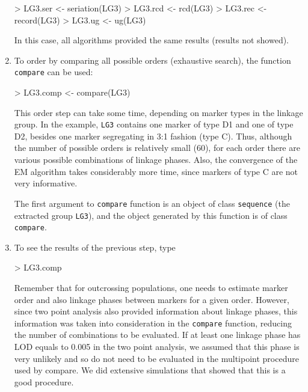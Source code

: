 \documentclass[letterpaper,12pt,oneside]{article}
\begin{document}
\begin{enumerate}
\begin{Schunk}
\begin{Sinput}
> LG3.ser <- seriation(LG3)
> LG3.rcd <- rcd(LG3)
> LG3.rec <- record(LG3)
> LG3.ug  <- ug(LG3)
\end{Sinput}
\end{Schunk}

In this case, all algorithms provided the same results (results not showed).

\item To order by comparing all possible orders (exhaustive search), the function {\tt compare} can be used:
\begin{Schunk}
\begin{Sinput}
> LG3.comp <- compare(LG3)
\end{Sinput}
\end{Schunk}

This order step can take some time, depending on marker types in the linkage group. In the example, {\tt LG3} contains one marker of type D1 and one of type D2, besides one marker segregating in 3:1 fashion (type C). Thus, although the number of possible orders is relatively small (60), for each order there are various possible combinations of linkage phases. Also, the convergence of the EM algorithm takes considerably more time, since markers of type C are not very informative. 

The first argument to {\tt compare} function is an object of class {\tt sequence} (the extracted group {\tt LG3}), and the object generated by this function is of class {\tt compare}.

\item To see the results of the previous step, type
\begin{Schunk}
\begin{Sinput}
> LG3.comp
\end{Sinput}
\end{Schunk}

Remember that for outcrossing populations, one needs to estimate marker order and also linkage phases between markers for a given order. However, since two point analysis also provided information about linkage phases, this information was taken into consideration in the {\tt compare} function, reducing the number of combinations to be evaluated. If at least one linkage phase has LOD equals to 0.005 in the two point analysis, we assumed that this phase is very unlikely and so do not need to be evaluated in the multipoint procedure used by compare. We did extensive simulations that showed that this is a good procedure. 


\end{enumerate}
\end{document}
